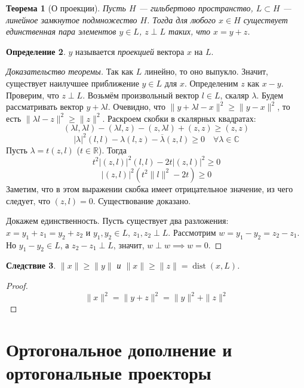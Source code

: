 \documentclass[11pt,openany,a4paper]{scrartcl}
\theoremstyle{plain}
\newtheorem{theorem}{Теорема}[section]
\newtheorem{corollary}[theorem]{Следствие}
\theoremstyle{definition}
\newtheorem{definition}[theorem]{Определение}
\newcommand\mb{\mathbb}
\newcommand\real{\mb R}
\newcommand{\complex}{\mb C}
\newcommand\ol{\overline}
\DeclareMathOperator{\dist}{dist}
\begin{document}
\begin{theorem}[О проекции]
    Пусть $H$ — гильбертово пространство, $L \subset H$ — линейное замкнутое 
    подмножество $H$. Тогда для любого $x \in H$ существует единственная пара
    элементов $y \in L$, $z \perp L$ таких, что $x = y + z$.
\end{theorem}
\begin{definition}
    $y$ называется \emph{проекцией} вектора $x$ на $L$.
\end{definition}
\begin{proof}[Доказательство теоремы]
    Так как $L$ линейно, то оно выпукло. Значит, существует наилучшее приближение
    $y \in L$ для $x$. Определеним $z$ как $x - y$. Проверим, что $z \perp L$.
    Возьмём произвольный вектор $l \in L$, скаляр $\lambda$. Будем рассматривать
    вектор $y + \lambda l$. Очевидно, что
    $\|y + \lambda l - x\|^2 \geqslant \|y - x\|^2$, то есть
    $\|\lambda l - z\|^2 \geqslant \|z\|^2$. Раскроем скобки в скалярных 
    квадратах:
    $$
    (\lambda l, \lambda l) - (\lambda l, z) - (z, \lambda l) + (z, z) \geqslant 
    (z, z)
    $$
    $$
    |\lambda|^2(l, l) - \lambda(l, z) - \ol\lambda(z, l) \geqslant 0\quad
    \forall \lambda \in \complex
    $$
    Пусть $\lambda = t(z, l)$ ($t \in \real$). Тогда
    $$
    t^2|(z, l)|^2(l, l) - 2t|(z, l)|^2 \geqslant 0
    $$
    $$
    |(z, l)|^2(t^2\|l\|^2 - 2t)\geqslant 0
    $$
    Заметим, что в этом выражении скобка имеет отрицательное значение, из чего
    следует, что $(z, l) = 0$. Существование доказано.
    
    Докажем единственность. Пусть существует два разложения:
    $x = y_1 + z_1 = y_2 + z_2$ и $y_1,y_2\in L$, $z_1,z_2 \perp L$.
    Рассмотрим $w = y_1 - y_2 = z_2 - z_1$. Но $y_1 - y_2 \in L$, а
    $z_2 - z_1 \perp L$, значит, $w \perp w \implies w = 0$.
\end{proof}

\begin{corollary}
    $\|x\| \geqslant \|y\|$ и $\|x\| \geqslant \|z\| = \dist(x, L)$.
\end{corollary}
\begin{proof}
    $$
    \|x\|^2 = \|y + z\|^2 = \|y\|^2 + \|z\|^2
    $$
\end{proof}

\section{Ортогональное дополнение и ортогональные проекторы}
\end{document}
